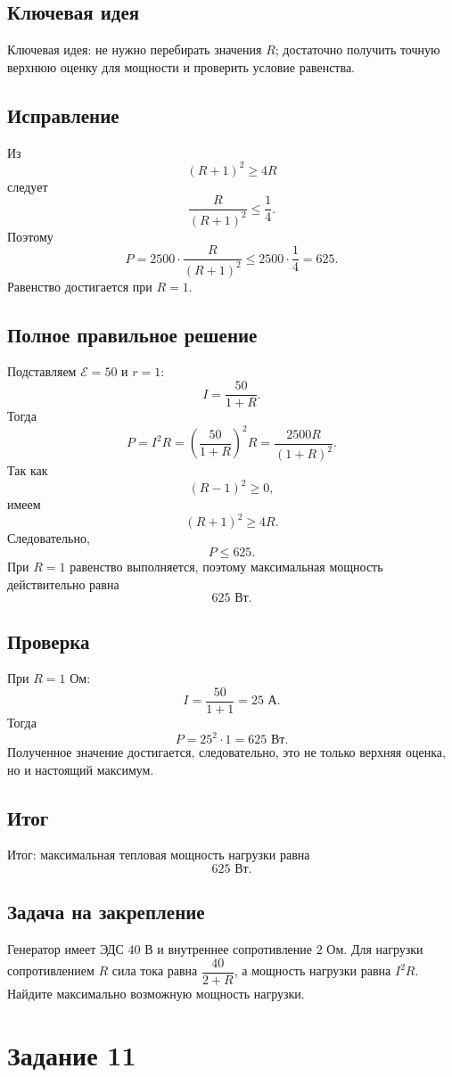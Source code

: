 \documentclass[12pt,a4paper]{article}
\begin{document}
\subsection*{Ключевая идея}
\textcolor{blue!60!black}{Ключевая идея:} не нужно перебирать значения $R$; достаточно получить точную верхнюю оценку для мощности и проверить условие равенства.

\subsection*{Исправление}
Из
\[
(R+1)^2\ge4R
\]
следует
\[
\frac{R}{(R+1)^2}\le\frac14.
\]
Поэтому
\[
P=2500\cdot\frac{R}{(R+1)^2}
\le 2500\cdot\frac14=625.
\]
Равенство достигается при $R=1$.

\subsection*{Полное правильное решение}
Подставляем $\mathcal E=50$ и $r=1$:
\[
I=\frac{50}{1+R}.
\]
Тогда
\[
P=I^2R
 =\left(\frac{50}{1+R}\right)^2R
 =\frac{2500R}{(1+R)^2}.
\]
Так как
\[
(R-1)^2\ge0,
\]
имеем
\[
(R+1)^2\ge4R.
\]
Следовательно,
\[
P\le625.
\]
При $R=1$ равенство выполняется, поэтому максимальная мощность действительно равна
\[
\boxed{625\text{ Вт}}.
\]

\subsection*{Проверка}
При $R=1$ Ом:
\[
I=\frac{50}{1+1}=25\text{ А}.
\]
Тогда
\[
P=25^2\cdot1=625\text{ Вт}.
\]
Полученное значение достигается, следовательно, это не только верхняя оценка, но и настоящий максимум.

\subsection*{Итог}
\textcolor{teal!60!black}{Итог:} максимальная тепловая мощность нагрузки равна
\[
625\text{ Вт}.
\]

\subsection*{Задача на закрепление}
Генератор имеет ЭДС $40$ В и внутреннее сопротивление $2$ Ом. Для нагрузки сопротивлением $R$ сила тока равна $\dfrac{40}{2+R}$, а мощность нагрузки равна $I^2R$. Найдите максимально возможную мощность нагрузки.

\newpage
{}\label{task:11}
\section*{Задание 11}
\end{document}
